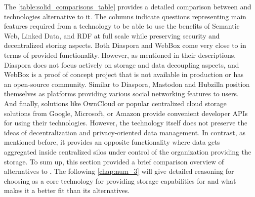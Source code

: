 The \autoref{table:solid_comparisons_table} provides a detailed comparison between \solid{} and technologies alternative to it. The columns indicate questions representing main features required from a technology to be able to use the benefits of Semantic Web, Linked Data, and RDF at full scale while preserving security and decentralized storing aspects. Both Diaspora and WebBox come very close to \solid{} in terms of provided functionality. However, as mentioned in their descriptions, Diaspora does not focus actively on storage and data decoupling aspects, and WebBox is a proof of concept project that is not available in production or has an open-source community. Similar to Diaspora, Mastodon and Hubzilla position themselves as platforms providing various social networking features to users. And finally, solutions like OwnCloud or popular centralized cloud storage solutions from Google, Microsoft, or Amazon provide convenient developer APIs for using their technologies. However, the technology itself does not preserve the ideas of decentralization and privacy-oriented data management. In contrast, as mentioned before, it provides an opposite functionality where data gets aggregated inside centralized silos under control of the organization providing the storage. 
To sum up, this section provided a brief comparison overview of alternatives to \solid{}. The following \autoref{chap:num_3} will give detailed reasoning for choosing \solid{} as a core technology for providing storage capabilities for \lpa{} and what makes it a better fit than its alternatives. 
